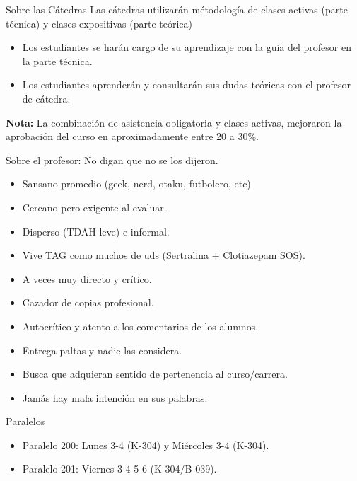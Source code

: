 \documentclass{beamer}
\begin{document}
\begin{frame}{Sobre las Cátedras}
Las cátedras utilizarán métodología de clases activas (parte técnica) y clases expositivas (parte teórica)
\begin{itemize}
\item Los estudiantes se harán cargo de su aprendizaje con la guía del profesor en la parte técnica. 
\item Los estudiantes aprenderán y consultarán sus dudas teóricas con el profesor de cátedra. 
\end{itemize}

\textbf{Nota:} La combinación de asistencia obligatoria y clases activas, mejoraron la aprobación del curso en aproximadamente entre 20 a 30\%.
\end{frame}

\begin{frame}{Sobre el profesor: No digan que no se los dijeron.}
\begin{itemize}
\item Sansano promedio (geek, nerd, otaku, futbolero, etc)
\item Cercano pero exigente al evaluar. 
\item Disperso (TDAH leve) e informal.
\item Vive TAG como muchos de uds (Sertralina + Clotiazepam SOS).
\item A veces muy directo y crítico. 
\item Cazador de copias profesional. 
\item Autocrítico y atento a los comentarios de los alumnos. 
\item Entrega paltas y nadie las considera. 
\item Busca que adquieran sentido de pertenencia al curso/carrera.
\item Jamás hay mala intención en sus palabras. 
\end{itemize}
\end{frame}

\begin{frame}{Paralelos}
\begin{itemize}
\item Paralelo 200: Lunes 3-4 (K-304) y Miércoles 3-4 (K-304).
\item Paralelo 201: Viernes 3-4-5-6 (K-304/B-039).
\end{itemize}
\end{frame}
\end{document}
